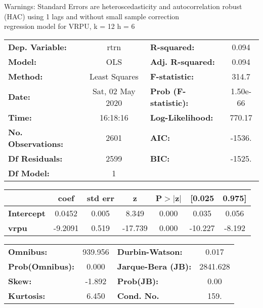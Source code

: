 Warnings: \newline
 [1] Standard Errors are heteroscedasticity and autocorrelation robust (HAC) using 1 lags and without small sample correction\\ 

regression model for VRPU, k = 12 h = 6\begin{center}
\begin{tabular}{lclc}
\toprule
\textbf{Dep. Variable:}    &       rtrn       & \textbf{  R-squared:         } &     0.094   \\
\textbf{Model:}            &       OLS        & \textbf{  Adj. R-squared:    } &     0.094   \\
\textbf{Method:}           &  Least Squares   & \textbf{  F-statistic:       } &     314.7   \\
\textbf{Date:}             & Sat, 02 May 2020 & \textbf{  Prob (F-statistic):} &  1.50e-66   \\
\textbf{Time:}             &     16:18:16     & \textbf{  Log-Likelihood:    } &    770.17   \\
\textbf{No. Observations:} &        2601      & \textbf{  AIC:               } &    -1536.   \\
\textbf{Df Residuals:}     &        2599      & \textbf{  BIC:               } &    -1525.   \\
\textbf{Df Model:}         &           1      & \textbf{                     } &             \\
\bottomrule
\end{tabular}
\begin{tabular}{lcccccc}
                   & \textbf{coef} & \textbf{std err} & \textbf{z} & \textbf{P$> |$z$|$} & \textbf{[0.025} & \textbf{0.975]}  \\
\midrule
\textbf{Intercept} &       0.0452  &        0.005     &     8.349  &         0.000        &        0.035    &        0.056     \\
\textbf{vrpu}      &      -9.2091  &        0.519     &   -17.739  &         0.000        &      -10.227    &       -8.192     \\
\bottomrule
\end{tabular}
\begin{tabular}{lclc}
\textbf{Omnibus:}       & 939.956 & \textbf{  Durbin-Watson:     } &    0.017  \\
\textbf{Prob(Omnibus):} &   0.000 & \textbf{  Jarque-Bera (JB):  } & 2841.628  \\
\textbf{Skew:}          &  -1.892 & \textbf{  Prob(JB):          } &     0.00  \\
\textbf{Kurtosis:}      &   6.450 & \textbf{  Cond. No.          } &     159.  \\
\bottomrule
\end{tabular}
\end{center}

